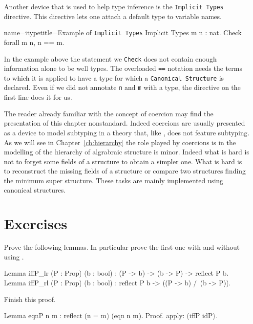 Another device that is used to help type inference is the
\lstinline/Implicit Types/ directive.  This directive lets
one attach a default type to variable names.

\begin{coq}{name=itype}{title=Example of \lstinline/Implicit Types/}
Implicit Types m n : nat.
Check forall m n, n == m.
\end{coq}

In the example above the statement we \lstinline/Check/ does not
contain enough information alone to be well types.  The overloaded
\lstinline/==/ notation needs the terms to which it is applied to
have a type for which a \lstinline/Canonical Structure/ is declared.
Even if we did not annotate \lstinline/n/ and \lstinline/m/ with a
type, the directive on the first line does it for us.

The reader already familiar with the concept of coercion
may find the presentation of this chapter nonstandard.
Indeed coercions are usually presented as a device to model
subtyping in a theory that, like \mcbCIC{}, does not
feature subtyping.  As we will see in Chapter~\ref{ch:hierarchy}
the role played by coercions is in the modelling of the hierarchy
of algrabraic structure is minor.  Indeed what is hard is not to
forget some fields of a structure to obtain a simpler one.  What
is hard is to reconstruct the missing fields of a structure
or compare two structures finding the minimum super structure.
These tasks are mainly implemented using canonical structures.


\section{Exercises}

\begin{Exercise}[label=ex:iffp,difficulty=0,title={reflect}]
Prove the following lemmas.  In particular prove the first
one with and without using .
\begin{coq}{}{}
Lemma iffP_lr (P : Prop) (b : bool) :
  (P -> b) -> (b -> P) -> reflect P b.
Lemma iffP_rl (P : Prop) (b : bool) :
  reflect P b -> ((P -> b) /\ (b -> P)).
\end{coq}
\end{Exercise}

\begin{Exercise}[label=ex:eqnP,difficulty=0,title={eqnP}]
Finish this proof.
\begin{coq}{}{}
Lemma eqnP n m : reflect (n = m) (eqn n m).
Proof.
apply: (iffP idP).
\end{coq}
\end{Exercise}


